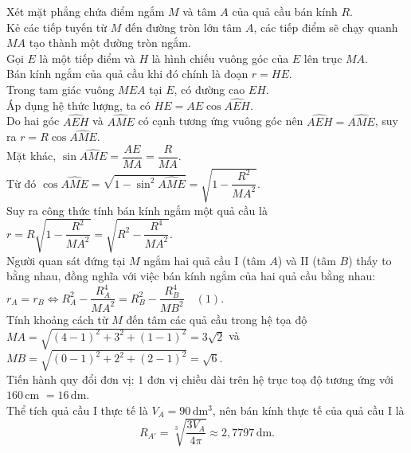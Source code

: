 \begin{ex}
{\begin{center}
		\end{center}
		Xét mặt phẳng chứa điểm ngắm $M$ và tâm $A$ của quả cầu bán kính $R$.\\ Kẻ các tiếp tuyến từ $M$ đến đường tròn lớn tâm $A$, các tiếp điểm sẽ chạy quanh $MA$ tạo thành một đường tròn ngắm. \\
		Gọi $E$ là một tiếp điểm và $H$ là hình chiếu vuông góc của $E$ lên trục $MA$.\\ Bán kính ngắm của quả cầu khi đó chính là đoạn $r = HE$.\\
		Trong tam giác vuông $MEA$ tại $E$, có đường cao $EH$.\\ Áp dụng hệ thức lượng, ta có $HE = AE \cos \widehat{AEH}$. \\
		Do hai góc $\widehat{AEH}$ và $\widehat{AME}$ có cạnh tương ứng vuông góc nên $\widehat{AEH} = \widehat{AME}$, suy ra $r = R \cos \widehat{AME}$.\\
		Mặt khác, $\sin \widehat{AME} = \dfrac{AE}{MA} = \dfrac{R}{MA}$.\\ Từ đó $\cos \widehat{AME} = \sqrt{1 - \sin^2 \widehat{AME}} = \sqrt{1 - \dfrac{R^2}{MA^2}}$.\\
		Suy ra công thức tính bán kính ngắm một quả cầu là $r = R \sqrt{1 - \dfrac{R^2}{MA^2}} = \sqrt{R^2 - \dfrac{R^4}{MA^2}}$.\\
		Người quan sát đứng tại $M$ ngắm hai quả cầu I (tâm $A$) và II (tâm $B$) thấy to bằng nhau, đồng nghĩa với việc bán kính ngắm của hai quả cầu bằng nhau: $r_A = r_B \Leftrightarrow R_A^2 - \dfrac{R_A^4}{MA^2} = R_B^2 - \dfrac{R_B^4}{MB^2} \quad (1)$.\\
		Tính khoảng cách từ $M$ đến tâm các quả cầu trong hệ tọa độ $MA = \sqrt{(4-1)^2 + 3^2 + (1-1)^2} = 3\sqrt{2}$ và $MB = \sqrt{(0-1)^2 + 2^2 + (2-1)^2} = \sqrt{6}$.\\
		Tiến hành quy đổi đơn vị: $1$ đơn vị chiều dài trên hệ trục toạ độ tương ứng với $160$\,cm $= 16$\,dm.\\
		Thể tích quả cầu I thực tế là $V_A = 90$\,dm$^3$, nên bán kính thực tế của quả cầu I là \[R_{A'} = \sqrt[3]{\dfrac{3V_A}{4\pi}} \approx 2{,}7797\,\text{dm}.\]
}
\end{ex}
